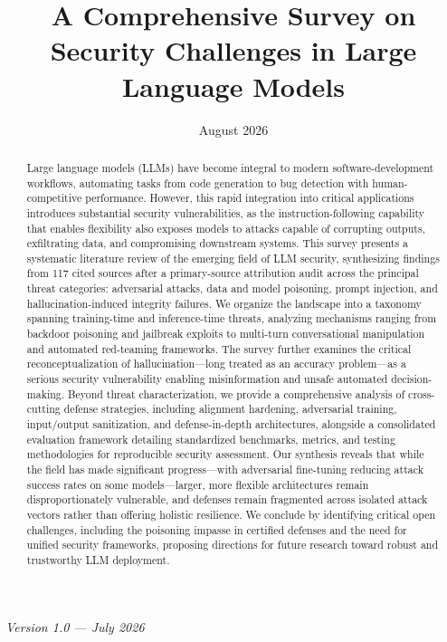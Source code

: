 \documentclass[11pt,a4paper]{article}
\title{A Comprehensive Survey on Security Challenges in Large Language Models}
\author{}
\date{August 2026}
\begin{document}
\maketitle

\begin{abstract}
Large language models (LLMs) have become integral to modern software-development workflows, automating tasks from code generation to bug detection with human-competitive performance. However, this rapid integration into critical applications introduces substantial security vulnerabilities, as the instruction-following capability that enables flexibility also exposes models to attacks capable of corrupting outputs, exfiltrating data, and compromising downstream systems. This survey presents a systematic literature review of the emerging field of LLM security, synthesizing findings from 117 cited sources after a primary-source attribution audit across the principal threat categories: adversarial attacks, data and model poisoning, prompt injection, and hallucination-induced integrity failures. We organize the landscape into a taxonomy spanning training-time and inference-time threats, analyzing mechanisms ranging from backdoor poisoning and jailbreak exploits to multi-turn conversational manipulation and automated red-teaming frameworks. The survey further examines the critical reconceptualization of hallucination---long treated as an accuracy problem---as a serious security vulnerability enabling misinformation and unsafe automated decision-making. Beyond threat characterization, we provide a comprehensive analysis of cross-cutting defense strategies, including alignment hardening, adversarial training, input/output sanitization, and defense-in-depth architectures, alongside a consolidated evaluation framework detailing standardized benchmarks, metrics, and testing methodologies for reproducible security assessment. Our synthesis reveals that while the field has made significant progress---with adversarial fine-tuning reducing attack success rates on some models---larger, more flexible architectures remain disproportionately vulnerable, and defenses remain fragmented across isolated attack vectors rather than offering holistic resilience. We conclude by identifying critical open challenges, including the poisoning impasse in certified defenses and the need for unified security frameworks, proposing directions for future research toward robust and trustworthy LLM deployment.
\end{abstract}


\textit{Version 1.0 --- July 2026}
\end{document}
